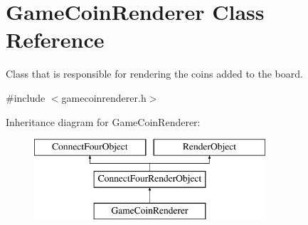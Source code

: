 \hypertarget{classGameCoinRenderer}{\section{\-Game\-Coin\-Renderer \-Class \-Reference}
\label{classGameCoinRenderer}
}


\-Class that is responsible for rendering the coins added to the board.  




{\ttfamily \#include $<$gamecoinrenderer.\-h$>$}

\-Inheritance diagram for \-Game\-Coin\-Renderer\-:\begin{figure}[H]
\begin{center}
\leavevmode
\includegraphics[height=3.000000cm]{classGameCoinRenderer}
\end{center}
\end{figure}

